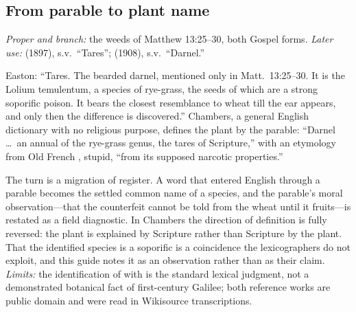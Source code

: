\subsection*{From parable to plant name}

\emph{Proper and branch:} the weeds of Matthew 13:25--30, both Gospel forms.
\emph{Later use:}  (1897), s.v.\ ``Tares'';
 (1908), s.v.\ ``Darnel.''

Easton: ``Tares. The bearded darnel, mentioned only in Matt.\ 13:25--30. It is
the Lolium temulentum, a species of rye-grass, the seeds of which are a strong
soporific poison. It bears the closest resemblance to wheat till the ear
appears, and only then the difference is discovered.'' Chambers, a general
English dictionary with no religious purpose, defines the plant by the
parable: ``Darnel \dots\ an annual of the rye-grass genus, the tares of
Scripture,'' with an etymology from Old French , stupid, ``from
its supposed narcotic properties.''

The turn is a migration of register. A word that entered English through a
parable becomes the settled common name of a species, and the parable's moral
observation---that the counterfeit cannot be told from the wheat until it
fruits---is restated as a field diagnostic. In Chambers the direction of
definition is fully reversed: the plant is explained by Scripture rather than
Scripture by the plant. That the identified species is a soporific is a
coincidence the lexicographers do not exploit, and this guide notes it as an
observation rather than as their claim. \emph{Limits:} the identification of
 with  is the standard lexical
judgment, not a demonstrated botanical fact of first-century Galilee; both
reference works are public domain and were read in Wikisource transcriptions.
